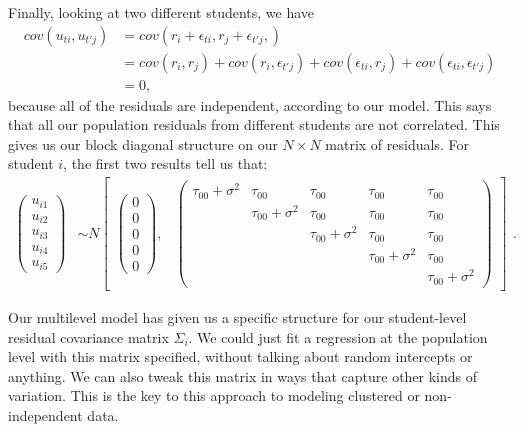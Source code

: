 \documentclass[
  letterpaper,
  DIV=11,
  numbers=noendperiod]{scrreprt}
\begin{document}
Finally, looking at two different students, we have \[
\begin{aligned}
cov( u_{ti}, u_{t'j} ) &= cov( r_{i} + \epsilon_{ti}, r_{j} + \epsilon_{t'j},  ) \\
  &= cov( r_{i}, r_{j} ) + cov( r_{i}, \epsilon_{t'j} ) + cov( \epsilon_{ti}, r_j ) + cov( \epsilon_{ti}, \epsilon_{t'j} ) \\
  &= 0 ,
\end{aligned}
\] because all of the residuals are independent, according to our model.
This says that all our population residuals from different students are
not correlated. This gives us our block diagonal structure on our
\(N \times N\) matrix of residuals. For student \(i\), the first two
results tell us that: \[\begin{aligned}
\begin{pmatrix} u_{i1} \\
u_{i2} \\
u_{i3} \\
u_{i4} \\
u_{i5}
\end{pmatrix} &\sim  N
\begin{bmatrix}
\begin{pmatrix}
0 \\
0 \\
0\\
0 \\
0
\end{pmatrix}\!\!,&
\begin{pmatrix}
\tau_{00} + \sigma^2 & \tau_{00} & \tau_{00} & \tau_{00} & \tau_{00} \\
           & \tau_{00} + \sigma^2 & \tau_{00} & \tau_{00} & \tau_{00} \\
         &              & \tau_{00} + \sigma^2 & \tau_{00} & \tau_{00} \\
         &              &             & \tau_{00} + \sigma^2 & \tau_{00} \\
         &              &              &            & \tau_{00} + \sigma^2 
\end{pmatrix}
\end{bmatrix}
\end{aligned} .\]

Our multilevel model has given us a specific structure for our
student-level residual covariance matrix \(\Sigma_i\). We could just fit
a regression at the population level with this matrix specified, without
talking about random intercepts or anything. We can also tweak this
matrix in ways that capture other kinds of variation. This is the key to
this approach to modeling clustered or non-independent data.
\end{document}
